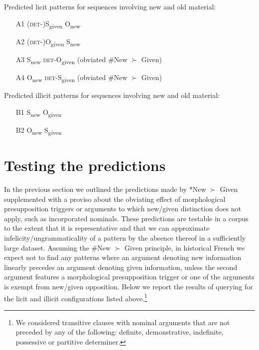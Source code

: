 \documentclass[output=paper,modfonts,nonflat]{langsci/langscibook}
\begin{document}
\ea
Predicted licit patterns for sequences involving new and old material: \label{licit}\\
\begin{itemize}
\item[A1] ({\scshape det}-)S\textsubscript{given} O\textsubscript{new}
\item[A2] ({\scshape det}-)O\textsubscript{given} S\textsubscript{new}
\item[A3] S\textsubscript{new} {\scshape det}-O\textsubscript{given} \hfill (obviated \#New $\succ$ Given)
\item[A4] O\textsubscript{new} {\scshape det}-S\textsubscript{given} \hfill (obviated \#New $\succ$ Given)
\end{itemize}
\z

\ea
Predicted illicit patterns for sequences involving new and old material: \label{illicit}\\
\begin{itemize}
\item[B1] S\textsubscript{new} O\textsubscript{given}
\item[B2] O\textsubscript{new} S\textsubscript{given}
\end{itemize}
\z


\section{Testing the predictions}
\label{section:predictions}

In the previous section we outlined the predictions made by *New $\succ$ Given supplemented with a proviso about the obviating effect of morphological presupposition triggers or arguments to which new/given distinction does not apply, such as incorporated nominals. These predictions are testable in a corpus to the extent that it is representative and that we can approximate infelicity/ungrammaticality of a pattern by the absence thereof in a sufficiently large dataset. Assuming the \#New $\succ$ Given principle, in historical French we expect not to find any patterns where an argument denoting new information linearly precedes an argument denoting given information, unless the second argument features a morphological presupposition trigger or one of the arguments is exempt from new/given opposition. Below we report the results of querying for the licit and illicit configurations listed above.\footnote{We considered transitive clauses with nominal arguments that are not preceded by any of the following: definite, demonstrative, indefinite, possessive or partitive determiner.}
\end{document}
